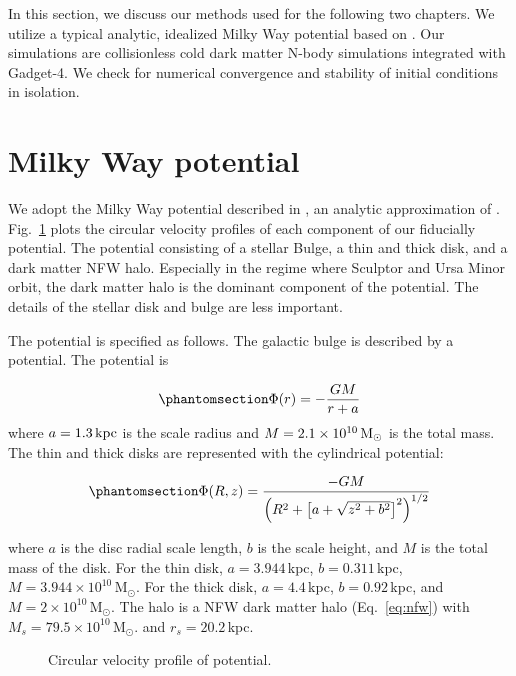 In this section, we discuss our methods used for the following two
chapters. We utilize a typical analytic, idealized Milky Way potential
based on \citet{mcmillan2011}. Our simulations are collisionless cold
dark matter N-body simulations integrated with Gadget-4. We check for
numerical convergence and stability of initial conditions in isolation.

\section{Milky Way potential}\label{milky-way-potential}

We adopt the Milky Way potential described in \citet{EP2020}, an
analytic approximation of \citet{mcmillan2011}.
Fig.~\ref{fig:v_circ_potential} plots the circular velocity profiles of
each component of our fiducially potential. The potential consisting of
a stellar Bulge, a thin and thick disk, and a dark matter NFW halo.
Especially in the regime where Sculptor and Ursa Minor orbit, the dark
matter halo is the dominant component of the potential. The details of
the stellar disk and bulge are less important.

The potential is specified as follows. The galactic bulge is described
by a \citet{hernquist1990} potential. The potential is

\begin{equation}\protect\phantomsection\label{eq:hernquist}{
\Phi(r) = - \frac{GM}{r + a}
}\end{equation} where \(a=1.3\,{\rm kpc}\) is the scale radius and
\(M=2.1 \times 10^{10}\,{\rm M}_{\odot}\) is the total mass. The thin and thick
disks are represented with the \citet{miyamoto+nagai1975} cylindrical
potential:

\begin{equation}\protect\phantomsection\label{eq:mn75}{
\Phi(R, z) = \frac{-GM}{\left(R^2 + \left[a + \sqrt{z^2 + b^2}\right]^{2}\right)^{1/2}}
}\end{equation}

where \(a\) is the disc radial scale length, \(b\) is the scale height,
and \(M\) is the total mass of the disk. For the thin disk,
\(a=3.944\,\)kpc, \(b=0.311\,\)kpc,
\(M=3.944\times10^{10}\,\)M\(_\odot\). For the thick disk,
\(a=4.4\,\)kpc, \(b=0.92\,\)kpc, and \(M=2\times10^{10}\,\)M\(_\odot\).
The halo is a NFW dark matter halo (Eq.~\ref{eq:nfw}) with
\(M_s=79.5\times10^{10}\,\)M\(_\odot\). and \(r_s = 20.2\,\)kpc.

\begin{figure}
\centering
{}
\caption[Circular velocity of potential]{Circular velocity profile of
\citet{EP2020} potential.}\label{fig:v_circ_potential}
\end{figure}

